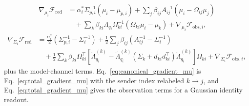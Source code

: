 \begin{equation}
\begin{aligned}
\nabla_{\mu_i}\mathcal{F}_{\mathrm{red}} &= \alpha_i^*\Sigma_{p,i}^{-1}(\mu_i - \mu_{p,i}) + \sum_j \beta_{ij}A_{ij}^{-1}(\mu_i - \Omega_{ij}\mu_j) \\
&\quad + \sum_k \beta_{ki}\Lambda_{q_i}\Omega_{ki}^{-1}\left(\Omega_{ki}\mu_i - \mu_k\right) + \nabla_{\mu_i}\mathcal{F}_{\mathrm{obs},i},
\end{aligned}
\label{eq:canonical_gradient_mu}
\end{equation}
\begin{equation}
\begin{aligned}
\nabla_{\Sigma_i}\mathcal{F}_{\mathrm{red}} &= \frac{\alpha_i^*}{2}\left(\Sigma_{p,i}^{-1} - \Sigma_i^{-1}\right) + \frac{1}{2}\sum_j \beta_{ij}\left(A_{ij}^{-1} - \Sigma_i^{-1}\right) \\
&\quad + \frac{1}{2}\sum_k \beta_{ki}\Omega_{ki}^{\top}\left[\tilde{\Lambda}_{q_i}^{(k)} - \tilde{\Lambda}_{q_i}^{(k)}\left(\Sigma_k + d_{ki}d_{ki}^{\top}\right)\tilde{\Lambda}_{q_i}^{(k)}\right]\Omega_{ki} + \nabla_{\Sigma_i}\mathcal{F}_{\mathrm{obs},i},
\end{aligned}
\label{eq:canonical_gradient_sigma}
\end{equation}
plus the model-channel terms. Eq.~\eqref{eq:canonical_gradient_mu} is Eq.~\eqref{eq:total_gradient_mu} with the sender index relabeled $k \to j$, and Eq.~\eqref{eq:total_gradient_mu} gives the observation terms for a Gaussian identity readout.

